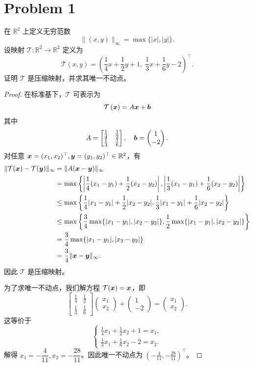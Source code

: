 \section*{Problem 1}

在 $\mathbb{R}^2$ 上定义无穷范数
\[
\|(x,y)\|_\infty = \max\{|x|,|y|\}.
\]
设映射 $\mathcal{T} : \mathbb{R}^2 \to \mathbb{R}^2$ 定义为
\[
\mathcal{T} \left(x,y\right) = \left(\frac14 x + \frac12 y + 1,\; \frac13 x + \frac16 y - 2\right)^\top.
\]
证明 $\mathcal{T}$ 是压缩映射，并求其唯一不动点。

\begin{proof}
在标准基下，$\mathcal{T}$ 可表示为
\[
\mathcal{T} \left(\boldsymbol{x}\right) = A \boldsymbol{x} + \boldsymbol{b}
\]
其中
\[A = \begin{bmatrix}
\frac14 & \frac12 \\
\frac13 & \frac16
\end{bmatrix}, \quad \boldsymbol{b} = \begin{pmatrix}
1 \\
-2
\end{pmatrix}.\]
对任意 $\boldsymbol{x} = (x_1, x_2)^\top, \boldsymbol{y} = (y_1, y_2)^\top \in \mathbb{R}^2$，有
\[\begin{aligned}
\|\mathcal{T}(\boldsymbol{x}) - \mathcal{T}(\boldsymbol{y})\|_\infty &= \|A(\boldsymbol{x} - \boldsymbol{y})\|_\infty \\
&= \max\left\{\left|\frac14 (x_1 - y_1) + \frac12 (x_2 - y_2)\right|, \left|\frac13 (x_1 - y_1) + \frac16 (x_2 - y_2)\right|\right\} \\
&\leq \max\left\{\frac14 |x_1 - y_1| + \frac12 |x_2 - y_2|, \frac13 |x_1 - y_1| + \frac16 |x_2 - y_2|\right\} \\
&\leq \max\left\{\frac34 \max\{|x_1 - y_1|, |x_2 - y_2|\}, \frac12 \max\{|x_1 - y_1|, |x_2 - y_2|\}\right\} \\
&= \frac34 \max\{|x_1 - y_1|, |x_2 - y_2|\} \\
&= \frac34 \|\boldsymbol{x} - \boldsymbol{y}\|_\infty.
\end{aligned}\]
因此 $\mathcal{T}$ 是压缩映射。

为了求唯一不动点，我们解方程 $\mathcal{T}(\boldsymbol{x}) = \boldsymbol{x}$，即
\[
\begin{bmatrix}
\frac14 & \frac12 \\
\frac13 & \frac16
\end{bmatrix}
\begin{pmatrix}
x_1 \\
x_2
\end{pmatrix} + \begin{pmatrix}
1 \\
-2
\end{pmatrix} = \begin{pmatrix}
x_1 \\
x_2
\end{pmatrix}.
\]
这等价于
\[
\begin{cases}
\frac14 x_1 + \frac12 x_2 + 1 = x_1, \\
\frac13 x_1 + \frac16 x_2 - 2 = x_2.
\end{cases}
\]
解得 $x_1 = -\dfrac{4}{11}, x_2 = -\dfrac{28}{11}$。因此唯一不动点为 $\boxed{\left(-\frac{4}{11}, -\frac{28}{11}\right)^\top}$。

\end{proof}

